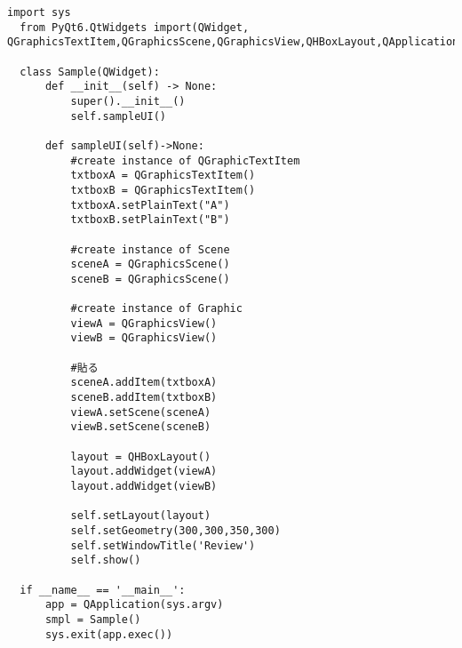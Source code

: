 \begin{lstlisting}[caption=sceneSample.py]
  import sys
  from PyQt6.QtWidgets import(QWidget, QGraphicsTextItem,QGraphicsScene,QGraphicsView,QHBoxLayout,QApplication)
  
  class Sample(QWidget):
      def __init__(self) -> None:
          super().__init__()
          self.sampleUI()
          
      def sampleUI(self)->None:
          #create instance of QGraphicTextItem
          txtboxA = QGraphicsTextItem()
          txtboxB = QGraphicsTextItem()
          txtboxA.setPlainText("A")
          txtboxB.setPlainText("B")
          
          #create instance of Scene
          sceneA = QGraphicsScene()
          sceneB = QGraphicsScene()
          
          #create instance of Graphic
          viewA = QGraphicsView()
          viewB = QGraphicsView()
          
          #貼る
          sceneA.addItem(txtboxA)
          sceneB.addItem(txtboxB)
          viewA.setScene(sceneA)
          viewB.setScene(sceneB)
          
          layout = QHBoxLayout()
          layout.addWidget(viewA)
          layout.addWidget(viewB)
          
          self.setLayout(layout)
          self.setGeometry(300,300,350,300)
          self.setWindowTitle('Review')
          self.show()
  
  if __name__ == '__main__':
      app = QApplication(sys.argv)
      smpl = Sample()
      sys.exit(app.exec())
  \end{lstlisting}